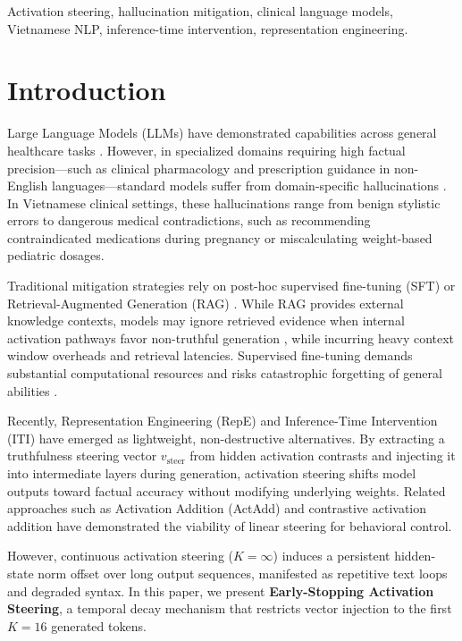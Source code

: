 \documentclass[conference]{IEEEtran}
\begin{document}
\begin{IEEEkeywords}
Activation steering, hallucination mitigation, clinical language models, Vietnamese NLP, inference-time intervention, representation engineering.
\end{IEEEkeywords}

\section{Introduction}
Large Language Models (LLMs) have demonstrated capabilities across general healthcare tasks \cite{ref3}. However, in specialized domains requiring high factual precision---such as clinical pharmacology and prescription guidance in non-English languages---standard models suffer from domain-specific hallucinations \cite{ref7}. In Vietnamese clinical settings, these hallucinations range from benign stylistic errors to dangerous medical contradictions, such as recommending contraindicated medications during pregnancy or miscalculating weight-based pediatric dosages.

Traditional mitigation strategies rely on post-hoc supervised fine-tuning (SFT) \cite{ref10} or Retrieval-Augmented Generation (RAG) \cite{ref5}. While RAG provides external knowledge contexts, models may ignore retrieved evidence when internal activation pathways favor non-truthful generation \cite{ref11}, while incurring heavy context window overheads and retrieval latencies. Supervised fine-tuning demands substantial computational resources and risks catastrophic forgetting of general abilities \cite{ref12}.

Recently, Representation Engineering (RepE) \cite{ref1} and Inference-Time Intervention (ITI) \cite{ref2} have emerged as lightweight, non-destructive alternatives. By extracting a truthfulness steering vector $v_{\text{steer}}$ from hidden activation contrasts and injecting it into intermediate layers during generation, activation steering shifts model outputs toward factual accuracy without modifying underlying weights. Related approaches such as Activation Addition (ActAdd) \cite{ref8} and contrastive activation addition \cite{ref9} have demonstrated the viability of linear steering for behavioral control.

However, continuous activation steering ($K=\infty$) induces a persistent hidden-state norm offset over long output sequences, manifested as repetitive text loops and degraded syntax. In this paper, we present \textbf{Early-Stopping Activation Steering}, a temporal decay mechanism that restricts vector injection to the first $K=16$ generated tokens.
\end{document}
